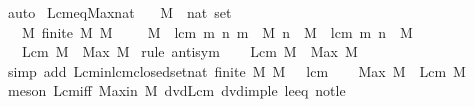 \begin{isabellebody}
\isamarkupfalse%
\ auto%
\endisatagproof
{\isafoldproof}%
%
\isadelimproof
\isanewline
%
\endisadelimproof
\isanewline
{}\isamarkupfalse%
\ Lcm{\isacharunderscore}{\kern0pt}eq{\isacharunderscore}{\kern0pt}Max{\isacharunderscore}{\kern0pt}nat{\isacharcolon}{\kern0pt}\isanewline
\ \ \ M\ {\isacharcolon}{\kern0pt}{\isacharcolon}{\kern0pt}\ {\isachardoublequoteopen}nat\ set{\isachardoublequoteclose}\ \isanewline
\ \ \ M{\isacharcolon}{\kern0pt}\ {\isachardoublequoteopen}finite\ M{\isachardoublequoteclose}\ {\isachardoublequoteopen}M\ {\isasymnoteq}\ {\isacharbraceleft}{\kern0pt}{\isacharbraceright}{\kern0pt}{\isachardoublequoteclose}\ {\isachardoublequoteopen}{}\ {\isasymnotin}\ M{\isachardoublequoteclose}\ \ lcm{\isacharcolon}{\kern0pt}\ {\isachardoublequoteopen}{\isasymAnd}m\ n{\isachardot}{\kern0pt}\ {\isasymlbrakk}m\ {\isasymin}\ M{\isacharsemicolon}{\kern0pt}\ n\ {\isasymin}\ M{\isasymrbrakk}\ {\isasymLongrightarrow}\ lcm\ m\ n\ {\isasymin}\ M{\isachardoublequoteclose}\isanewline
\ \ \ {\isachardoublequoteopen}Lcm\ M\ {\isacharequal}{\kern0pt}\ Max\ M{\isachardoublequoteclose}\isanewline
%
\isadelimproof
%
\endisadelimproof
%
\isatagproof
{}\isamarkupfalse%
\ {\isacharparenleft}{\kern0pt}rule\ antisym{\isacharparenright}{\kern0pt}\isanewline
\ \ \isamarkupfalse%
\ {\isachardoublequoteopen}Lcm\ M\ {\isasymle}\ Max\ M{\isachardoublequoteclose}\isanewline
\ \ \ \ \isamarkupfalse%
\ {\isacharparenleft}{\kern0pt}simp\ add{\isacharcolon}{\kern0pt}\ Lcm{\isacharunderscore}{\kern0pt}in{\isacharunderscore}{\kern0pt}lcm{\isacharunderscore}{\kern0pt}closed{\isacharunderscore}{\kern0pt}set{\isacharunderscore}{\kern0pt}nat\ {\isacartoucheopen}finite\ M{\isacartoucheclose}\ {\isacartoucheopen}M\ {\isasymnoteq}\ {\isacharbraceleft}{\kern0pt}{\isacharbraceright}{\kern0pt}{\isacartoucheclose}\ lcm{\isacharparenright}{\kern0pt}\isanewline
\ \ \isamarkupfalse%
\ {\isachardoublequoteopen}Max\ M\ {\isasymle}\ Lcm\ M{\isachardoublequoteclose}\isanewline
\ \ \ \ \isamarkupfalse%
\ {\isacharparenleft}{\kern0pt}meson\ Lcm{\isacharunderscore}{\kern0pt}{}{\isacharunderscore}{\kern0pt}iff\ Max{\isacharunderscore}{\kern0pt}in\ M\ dvd{\isacharunderscore}{\kern0pt}Lcm\ dvd{\isacharunderscore}{\kern0pt}imp{\isacharunderscore}{\kern0pt}le\ le{\isacharunderscore}{\kern0pt}{}{\isacharunderscore}{\kern0pt}eq\ not{\isacharunderscore}{\kern0pt}le{\isacharparenright}{\kern0pt}\isanewline

\end{isabellebody}
